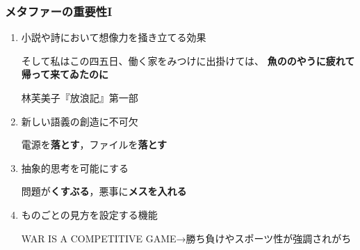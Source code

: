 \documentclass[11pt]{beamer}
\newlength{\la}
\let\oldcitep=\citep
\renewcommand\citep[1]{\hyperlink{#1}{\oldcitep{#1}}}
\newcommand\metaphorical[1]{\textcolor{sRed}{\textbf{#1}}}
\newenvironment{xleftbar}[1][\hsize]{%
    \def\FrameCommand{\vrule width 3pt \hspace{10pt}}%
    \MakeFramed{\hsize#1\advance\hsize-\width\FrameRestore}%
}
{\endMakeFramed}
\begin{document}
\begin{frame}
\frametitle{メタファーの重要性I}
\setlength{\leftmargini}{0em}
\begin{enumerate}
    \item 小説や詩において想像力を掻き立てる効果

        \begin{xleftbar}[\linewidth]
            そして私はこの四五日、働く家をみつけに出掛けては、
            \metaphorical{魚ののやうに疲れて帰って来てゐたのに}

            \hfill 林芙美子『放浪記』第一部
        \end{xleftbar}
    \item 新しい語義の創造に不可欠\nocite{rhetorickankaku}

        電源を\metaphorical{落とす}，ファイルを\metaphorical{落とす}

    \item 抽象的思考を可能にする\nocite{lakoff1980}

        問題が\metaphorical{くすぶる}，悪事に\metaphorical{メスを入れる}

    \item ものごとの見方を設定する機能

        WAR IS A COMPETITIVE GAME→勝ち負けやスポーツ性が強調されがち\citep{lakoff1991}


\end{enumerate}
\end{frame}
\end{document}
